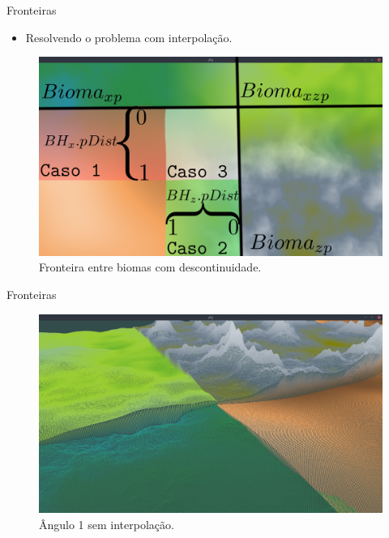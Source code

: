 \begin{frame}{Fronteiras}
    \begin{itemize} \setlength\itemsep{1em}
        \item Resolvendo o problema com interpolação.
    \end{itemize}
    
    \begin{figure}[H]
        \centering
        \includegraphics[width=.9\textwidth]{img/border/yeah.png}
        \caption{Fronteira entre biomas com descontinuidade.}
        \label{fig:img_border_yeah}
    \end{figure}
    
\end{frame}

\begin{frame}{Fronteiras}
    \begin{figure}[H]
        \centering
        \includegraphics[width=.9\textwidth]{img/border/a9/1s.png}
        \caption{Ângulo 1 sem interpolação.}
        \label{fig:img_border_a9_1s}
    \end{figure}
    
\end{frame}


